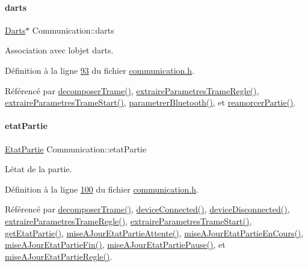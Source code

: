 \paragraph{\texorpdfstring{darts}{darts}}
{\footnotesize\ttfamily \hyperlink{class_darts}{Darts}$\ast$ Communication\+::darts\hspace{0.3cm}{\ttfamily [private]}}



Association avec l\textquotesingle{}objet darts. 



Définition à la ligne \hyperlink{communication_8h_source_l00093}{93} du fichier \hyperlink{communication_8h_source}{communication.\+h}.



Référencé par \hyperlink{communication_8cpp_source_l00188}{decomposer\+Trame()}, \hyperlink{communication_8cpp_source_l00279}{extraire\+Parametres\+Trame\+Regle()}, \hyperlink{communication_8cpp_source_l00243}{extraire\+Parametres\+Trame\+Start()}, \hyperlink{communication_8cpp_source_l00059}{parametrer\+Bluetooth()}, et \hyperlink{communication_8cpp_source_l00305}{reamorcer\+Partie()}.

\mbox{\label{class_communication_a2539ded2780db2c732690c585c768c96}} 
\paragraph{\texorpdfstring{etat\+Partie}{etatPartie}}
{\footnotesize\ttfamily \hyperlink{class_communication_aaa8ce2e87a389c88f4f9a2f07b66ebdd}{Etat\+Partie} Communication\+::etat\+Partie\hspace{0.3cm}{\ttfamily [private]}}



L\textquotesingle{}état de la partie. 



Définition à la ligne \hyperlink{communication_8h_source_l00100}{100} du fichier \hyperlink{communication_8h_source}{communication.\+h}.



Référencé par \hyperlink{communication_8cpp_source_l00188}{decomposer\+Trame()}, \hyperlink{communication_8cpp_source_l00329}{device\+Connected()}, \hyperlink{communication_8cpp_source_l00353}{device\+Disconnected()}, \hyperlink{communication_8cpp_source_l00279}{extraire\+Parametres\+Trame\+Regle()}, \hyperlink{communication_8cpp_source_l00243}{extraire\+Parametres\+Trame\+Start()}, \hyperlink{communication_8cpp_source_l00049}{get\+Etat\+Partie()}, \hyperlink{communication_8cpp_source_l00382}{mise\+A\+Jour\+Etat\+Partie\+Attente()}, \hyperlink{communication_8cpp_source_l00415}{mise\+A\+Jour\+Etat\+Partie\+En\+Cours()}, \hyperlink{communication_8cpp_source_l00404}{mise\+A\+Jour\+Etat\+Partie\+Fin()}, \hyperlink{communication_8cpp_source_l00393}{mise\+A\+Jour\+Etat\+Partie\+Pause()}, et \hyperlink{communication_8cpp_source_l00426}{mise\+A\+Jour\+Etat\+Partie\+Regle()}.

